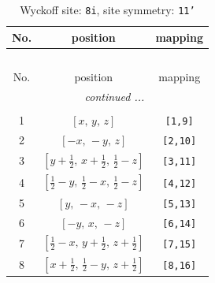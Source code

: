 \documentclass[fleqn,8pt]{jsarticle}
\begin{document}
\renewcommand{\arraystretch}{1.2}
\begin{longtable}{ccc}
\caption{Wyckoff site: {\tt 8i}, site symmetry: {\tt 11'}}
 \\
 \hline \hline
No. & position & mapping \\ \hline \endfirsthead

\multicolumn{2}{l}{\tablename\ \thetable{}} \\
 \hline \hline
No. & position & mapping \\ \hline \endhead

 \hline \hline
\multicolumn{2}{r}{\footnotesize\it continued ...} \\ \endfoot

 \hline \hline
\multicolumn{2}{r}{} \\ \endlastfoot

1 & $\left[ x,\, y,\, z \right]$ & {\tt [1,9]} \\ \hline
2 & $\left[ - x,\, - y,\, z \right]$ & {\tt [2,10]} \\ \hline
3 & $\left[ y + \frac{1}{2},\, x + \frac{1}{2},\, \frac{1}{2} - z \right]$ & {\tt [3,11]} \\ \hline
4 & $\left[ \frac{1}{2} - y,\, \frac{1}{2} - x,\, \frac{1}{2} - z \right]$ & {\tt [4,12]} \\ \hline
5 & $\left[ y,\, - x,\, - z \right]$ & {\tt [5,13]} \\ \hline
6 & $\left[ - y,\, x,\, - z \right]$ & {\tt [6,14]} \\ \hline
7 & $\left[ \frac{1}{2} - x,\, y + \frac{1}{2},\, z + \frac{1}{2} \right]$ & {\tt [7,15]} \\ \hline
8 & $\left[ x + \frac{1}{2},\, \frac{1}{2} - y,\, z + \frac{1}{2} \right]$ & {\tt [8,16]} \\
\end{longtable}
\end{document}
